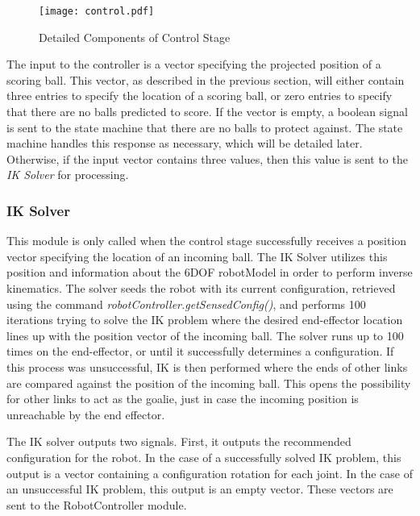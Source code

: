 \documentclass{article}
\begin{document}
\begin{figure}[h]
\begin{center}
\texttt{[image: control.pdf]}
\caption{\label{fig:control} Detailed Components of Control Stage}
\end{center}
\end{figure}

The input to the controller is a vector specifying the projected position of a scoring ball. This vector, as described in the previous section, will either contain three entries to specify the location of a scoring ball, or zero entries to specify that there are no balls predicted to score. If the vector is empty, a boolean signal is sent to the state machine that there are no balls to protect against. The state machine handles this response as necessary, which will be detailed later. Otherwise, if the input vector contains three values, then this value is sent to the \emph{IK Solver} for processing.


\subsubsection*{IK Solver}
This module is only called when the control stage successfully receives a position vector specifying the location of an incoming ball. The IK Solver utilizes this position and information about the 6DOF robotModel in order to perform inverse kinematics. The solver seeds the robot with its current configuration, retrieved using the command \emph{robotController.getSensedConfig()}, and performs 100 iterations trying to solve the IK problem where the desired end-effector location lines up with the position vector of the incoming ball. The solver runs up to 100 times on the end-effector, or until it successfully determines a configuration. If this process was unsuccessful, IK is then performed where the ends of other links are compared against the position of the incoming ball. This opens the possibility for other links to act as the goalie, just in case the incoming position is unreachable by the end effector. \par 

The IK solver outputs two signals. First, it outputs the recommended configuration for the robot. In the case of a successfully solved IK problem, this output is a vector containing a configuration rotation for each joint. In the case of an unsuccessful IK problem, this output is an empty vector. These vectors are sent to the RobotController module. \par 
\end{document}
